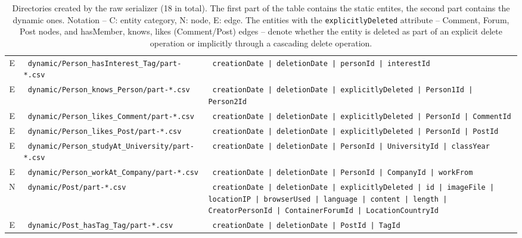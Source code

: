 \begin{table}[htb]
\begin{tabularx}{\linewidth}{|>{\sffamily}c|>{\tt}l|>{\tt}X|}
        E                    & dynamic/Person\_hasInterest\_Tag/part-*.csv      & creationDate | deletionDate | personId | interestId \\
        E                    & dynamic/Person\_knows\_Person/part-*.csv         & creationDate | deletionDate | explicitlyDeleted | Person1Id | Person2Id \\
        E                    & dynamic/Person\_likes\_Comment/part-*.csv        & creationDate | deletionDate | explicitlyDeleted | PersonId | CommentId \\
        E                    & dynamic/Person\_likes\_Post/part-*.csv           & creationDate | deletionDate | explicitlyDeleted | PersonId | PostId \\
        E                    & dynamic/Person\_studyAt\_University/part-*.csv   & creationDate | deletionDate | PersonId | UniversityId | classYear \\
        E                    & dynamic/Person\_workAt\_Company/part-*.csv       & creationDate | deletionDate | PersonId | CompanyId | workFrom \\
        \hline
        N                    & dynamic/Post/part-*.csv                          & creationDate | deletionDate | explicitlyDeleted | id | imageFile | locationIP | browserUsed | language | content | length | CreatorPersonId | ContainerForumId | LocationCountryId \\
        E                    & dynamic/Post\_hasTag\_Tag/part-*.csv             & creationDate | deletionDate | PostId | TagId \\
        \hline
    \end{tabularx}
    \caption{Directories created by the raw serializer (18 in total). The first part of the table contains the static entites, the second part contains the dynamic ones.
        Notation -- \textsf{C}: entity category, \textsf{N}: node, \textsf{E}: edge.
        The entities with the \texttt{explicitlyDeleted} attribute -- Comment, Forum, Post nodes, and hasMember, knows, likes (Comment/Post) edges -- denote whether the entity is deleted as part of an explicit delete operation or implicitly through a cascading delete operation.}
    \label{table:csv-raw}
\end{table}
